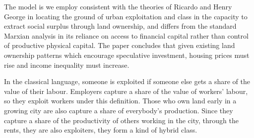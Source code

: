 The model is we employ consistent with the theories of Ricardo and Henry George in locating the ground of urban exploitation and class in the capacity to extract social surplus through land ownership, and differs from the standard Marxian analysis in its reliance on access to financial capital rather than control of productive physical capital. The paper concludes that given existing land ownership patterns which encourage speculative investment, housing prices must rise and income inequality must increase. 

In the classical language, someone is exploited if someone else gets a share of the value of their labour. %
 Employers capture a share of the value of workers' labour, so they exploit workers under this definition.
Those who own land early in a growing city are also capture a share of everybody's production. Since they capture a share of the productivity of others working in the city, through the rents, they are also exploiters, they form a kind of hybrid class. %
